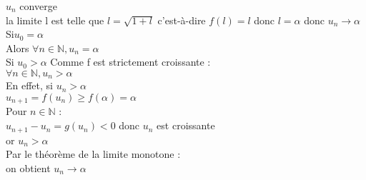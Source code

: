 \documentclass{article}
\begin{document}
$u_n$ converge \\ 
la limite l est telle que $l=\sqrt{1+l}$ c'est-à-dire $f(l)=l$ donc $l=\alpha$
donc $u_n \rightarrow \alpha$ \\ 
Si$u_0= \alpha$ \\ 
Alors $\forall n \in \mathbb{N},u_n= \alpha$ \\ 
Si $u_0>\alpha$
Comme f est strictement croissante : \\ 
$\forall n \in \mathbb{N}, u_n > \alpha$ \\ 
En effet, si $u_n> \alpha$ \\
$u_{n+1}=f(u_n)\geq f(\alpha)=\alpha$ \\ 
Pour $n \in \mathbb{N}$ : \\ 
$u_{n+1}-u_n=g(u_n)<0$ donc $u_n$ est croissante \\ 
or $u_n> \alpha$ \\ 
Par le théorème de la limite monotone : \\ 
on obtient $u_n \rightarrow \alpha$
\end{document}
